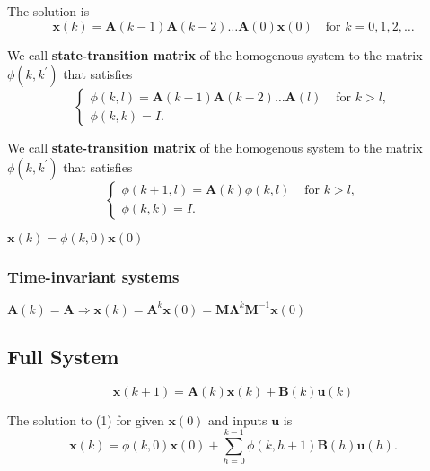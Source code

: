 \begin{proposition} The solution is
    \[
        \mathbf{x}(k) = \mathbf{A}(k - 1)\mathbf{A}(k - 2)\dots \mathbf{A}(0)\mathbf{x}(0) \quad\text{for } k = 0,1,2, \ldots
    \]
\end{proposition}

\begin{definition}
    We call \textbf{state-transition matrix} of the homogenous system to the matrix \(\phi (k,k^{\prime})\) that satisfies
    \[
        \left\{ \begin{array}{ll}\phi (k,l) = \mathbf{A}(k - 1)\mathbf{A}(k - 2)\dots \mathbf{A}(l) & \text{ for } k > l,\\ \phi (k,k) = I. \end{array} \right.
    \]
\end{definition}

\begin{definition}
    We call \textbf{state-transition matrix} of the homogenous system to the matrix \(\phi (k,k^{\prime})\) that satisfies
    \[
        \left\{ \begin{array}{ll}\phi (k + 1,l) = \mathbf{A}(k)\phi (k,l) & \text{ for } k > l,\\ \phi (k,k) = I. \end{array} \right.
    \]
\end{definition}

\begin{remark*}
    $ \mathbf{x}(k) = \phi (k,0)\mathbf{x}(0) $
\end{remark*}

\subsubsection{Time-invariant systems} $\mathbf{A}(k) = \mathbf{A} \Longrightarrow  \mathbf{x}(k) = \mathbf{A} ^{k}\mathbf{x}(0) = \mathbf{M}\mathbf{\Lambda}^{k}\mathbf{M}^{-1}\mathbf{x}(0)$

\subsection{Full System}
\[
    \mathbf{x}(k + 1) = \mathbf{A}(k)\mathbf{x}(k) + \mathbf{B}(k)\mathbf{u}(k)
\]
\begin{proposition}
    The solution to (1) for given \(\mathbf{x}(0)\) and inputs \(\mathbf{u}\) is
    \[
        \mathbf{x}(k) = \phi (k,0)\mathbf{x}(0) + \sum_{h = 0}^{k - 1}\phi (k,h + 1)\mathbf{B}(h)\mathbf{u}(h).
    \]
\end{proposition}

